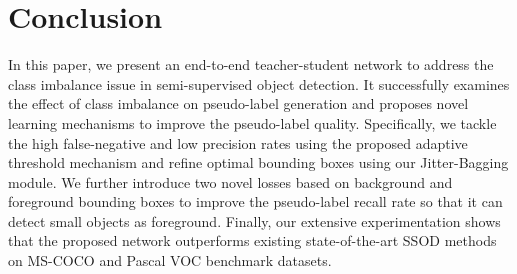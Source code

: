 \documentclass[10pt,twocolumn,letterpaper]{article}
\begin{document}
\section{Conclusion}
In this paper, we present an end-to-end teacher-student network to address the class imbalance issue in semi-supervised object detection. It successfully examines the effect of class imbalance on pseudo-label generation and proposes novel learning mechanisms to improve the pseudo-label quality. Specifically, we tackle the high false-negative and low precision rates using the proposed adaptive threshold mechanism and refine optimal bounding boxes using our Jitter-Bagging module.
We further introduce two novel losses based on background and foreground bounding boxes to improve the pseudo-label recall rate so that it can detect small objects as foreground. Finally, our extensive experimentation shows that the proposed network outperforms existing state-of-the-art SSOD methods on MS-COCO and Pascal VOC benchmark datasets.






\balance
{\small


}
\end{document}
